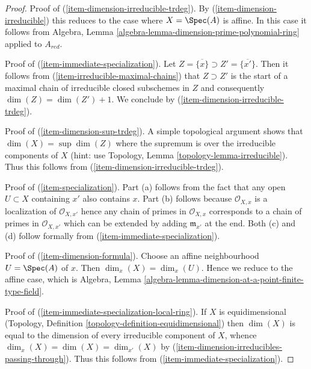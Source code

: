 \begin{proof}
\medskip\noindent
Proof of (\ref{item-dimension-irreducible-trdeg}). By
(\ref{item-dimension-irreducible}) this reduces to the case where
$X = \Spec(A)$ is affine. In this case it follows from
Algebra, Lemma \ref{algebra-lemma-dimension-prime-polynomial-ring}
applied to $A_{red}$.

\medskip\noindent
Proof of (\ref{item-immediate-specialization}).
Let $Z = \overline{\{x\}} \supset Z' = \overline{\{x'\}}$.
Then it follows from (\ref{item-irreducible-maximal-chains}) that
$Z \supset Z'$ is the start of a maximal chain of
irreducible closed subschemes in $Z$
and consequently $\dim(Z) = \dim(Z') + 1$.
We conclude by (\ref{item-dimension-irreducible-trdeg}).

\medskip\noindent
Proof of (\ref{item-dimension-sup-trdeg}). A simple topological argument
shows that $\dim(X) = \sup \dim(Z)$ where the supremum is over the
irreducible components of $X$ (hint: use
Topology, Lemma \ref{topology-lemma-irreducible}).
Thus this follows from (\ref{item-dimension-irreducible-trdeg}).

\medskip\noindent
Proof of (\ref{item-specialization}). Part (a) follows from the
fact that any open $U \subset X$ containing $x'$ also contains $x$.
Part (b) follows because $\mathcal{O}_{X, x}$ is a localization of
$\mathcal{O}_{X, x'}$ hence any chain of primes in $\mathcal{O}_{X, x}$
corresponds to a chain of primes in $\mathcal{O}_{X, x'}$ which can
be extended by adding $\mathfrak m_{x'}$ at the end.
Both (c) and (d) follow formally from (\ref{item-immediate-specialization}).

\medskip\noindent
Proof of (\ref{item-dimension-formula}). Choose an affine
neighbourhood $U = \Spec(A)$ of $x$. Then $\dim_x(X) = \dim_x(U)$.
Hence we reduce to the affine case, which is
Algebra, Lemma \ref{algebra-lemma-dimension-at-a-point-finite-type-field}.

\medskip\noindent
Proof of (\ref{item-immediate-specialization-local-ring}).
If $X$ is equidimensional
(Topology, Definition \ref{topology-definition-equidimensional})
then $\dim(X)$ is equal to the dimension of every irreducible
component of $X$, whence $\dim_x(X) = \dim(X) = \dim_{x'}(X)$
by (\ref{item-dimension-irreducibles-passing-through}).
Thus this follows from (\ref{item-immediate-specialization}).
\end{proof}


